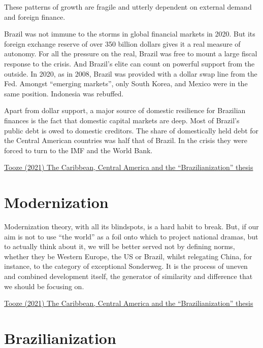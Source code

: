 \documentclass[
]{book}
\begin{document}
These patterns of growth are fragile and utterly dependent on external demand and foreign finance.

Brazil was not immune to the storms in global financial markets in 2020. But its foreign exchange reserve of over 350 billion dollars gives it a real measure of autonomy. For all the pressure on the real, Brazil was free to mount a large fiscal response to the crisis. And Brazil's elite can count on powerful support from the outside. In 2020, as in 2008, Brazil was provided with a dollar swap line from the Fed. Amongst ``emerging markets'', only South Korea, and Mexico were in the same position. Indonesia was rebuffed.

Apart from dollar support, a major source of domestic resilience for Brazilian finances is the fact that domestic capital markets are deep. Most of Brazil's public debt is owed to domestic creditors. The share of domestically held debt for the Central American countries was half that of Brazil. In the crisis they were forced to turn to the IMF and the World Bank.

\href{https://adamtooze.substack.com/p/chartbook-newsletter-20}{Tooze (2021) The Caribbean, Central America and the ``Brazilianization'' thesis}

\hypertarget{modernization}{%
\section{Modernization}\label{modernization}}

Modernization theory, with all its blindspots, is a hard habit to break.
But, if our aim is not to use ``the world'' as a foil onto which to project national dramas, but to actually think about it, we will be better served not by defining norms, whether they be Western Europe, the US or Brazil, whilst relegating China, for instance, to the category of exceptional Sonderweg. It is the process of uneven and combined development itself, the generator of similarity and difference that we should be focusing on.

\href{https://adamtooze.substack.com/p/chartbook-newsletter-20}{Tooze (2021) The Caribbean, Central America and the ``Brazilianization'' thesis}

\hypertarget{brazilianization}{%
\section{Brazilianization}\label{brazilianization}}
\end{document}
